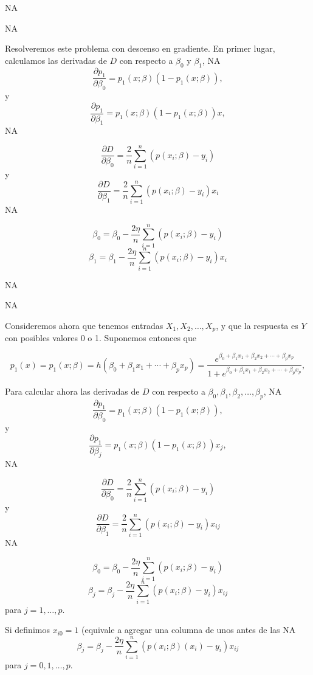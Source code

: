 \documentclass[nohyper]{tufte-handout}
\begin{document}
NA



NA


Resolveremos este problema con descenso en gradiente. En primer lugar,
calculamos las derivadas de $D$ con respecto a $\beta_0$ y $\beta_1$,
NA
$$\frac{\partial  p_1}{\partial \beta_0} = {p_1(x;\beta)(1-p_1(x;\beta))},$$
y 
$$\frac{\partial  p_1}{\partial \beta_1} = {p_1(x;\beta)(1-p_1(x;\beta))x},$$
NA

$$ \frac{\partial D}{\partial\beta_0} = \frac{2}{n}\sum_{i=1}^n   (p(x_i;\beta)-y_i)$$
y 
$$ \frac{\partial D}{\partial\beta_1} = \frac{2}{n}\sum_{i=1}^n   (p(x_i;\beta)-y_i)x_i$$
NA

\begin{shaded}
$$\beta_0 = \beta_0 - \frac{2\eta}{n} \sum_{i=1}^n (p(x_i;\beta) -y_i)$$
$$\beta_1 = \beta_1 - \frac{2\eta}{n} \sum_{i=1}^n (p(x_i;\beta)-y_i)x_i$$
\end{shaded}
NA


NA

Consideremos ahora que tenemos entradas $X_1,X_2,\ldots, X_p$, y que la 
respuesta es $Y$ con posibles valores 0 o 1. Suponemos entonces que


$$p_1(x)=p_1(x;\beta)= h(\beta_0+\beta_1x_1+\cdots+\beta_px_p)= 
\frac{e^{\beta_0+\beta_1x_1+\beta_2x_2+\cdots+\beta_px_p}}{1+ e^{\beta_0+\beta_1x_1+\beta_2x_2+\cdots+\beta_px_p}},$$

Para calcular ahora las derivadas de $D$ con respecto a $\beta_0, \beta_1,\beta_2,\ldots, \beta_p$,
NA
$$\frac{\partial  p_1}{\partial \beta_0} = {p_1(x;\beta)(1-p_1(x;\beta))},$$
y 
$$\frac{\partial  p_1}{\partial \beta_j} = {p_1(x;\beta)(1-p_1(x;\beta))x_j},$$
NA

$$ \frac{\partial D}{\partial\beta_0} = \frac{2}{n}\sum_{i=1}^n   (p(x_i;\beta)-y_i)$$
y 
$$ \frac{\partial D}{\partial\beta_1} = \frac{2}{n}\sum_{i=1}^n   (p(x_i;\beta)-y_i)x_{ij}$$
NA

\begin{shaded}
$$\beta_0 = \beta_0 - \frac{2\eta}{n} \sum_{i=1}^n (p(x_i;\beta)-y_i)$$
$$\beta_j = \beta_j - \frac{2\eta}{n} \sum_{i=1}^n (p(x_i;\beta)-y_i)x_{ij}$$
para $j=1,\ldots, p$.
\end{shaded}

\begin{shaded}

Si definimos $x_{i0} = 1$ (equivale a agregar una columna de unos antes de las
NA
$$\beta_j = \beta_j - \frac{2\eta}{n} \sum_{i=1}^n (p(x_i;\beta)(x_i)-y_i)x_{ij}$$
para $j=0,1,\ldots, p$.
\end{shaded}
\end{document}

